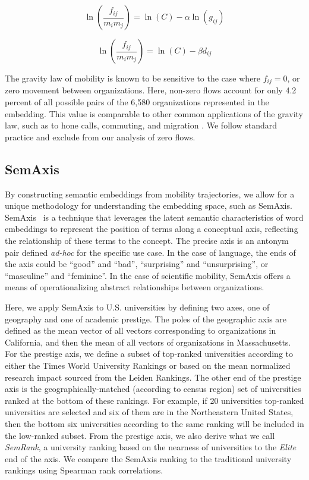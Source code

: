 \documentclass[12pt]{article} %
\begin{document}
\begin{equation}
    \label{eq:linear_flux_geo}
    \ln(\frac{f_{ij}}{m_im_j}) = \ln(C)  - \alpha \ln(g_{ij})
\end{equation}

\begin{equation}
    \label{eq:linear_flux_emb}
    \ln(\frac{f_{ij}}{m_im_j}) = \ln(C) - \beta d_{ij}
\end{equation}

The gravity law of mobility is known to be sensitive to the case where $f_{ij} = 0$, or zero movement between organizations. 
Here, non-zero flows account for only 4.2 percent of all possible pairs of the 6,580 organizations represented in the embedding.
This value is comparable to other common applications of the gravity law, such as to hone calls, commuting, and migration \cite{simini2012universal}.
We follow standard practice and exclude from our analysis of zero flows. 


%
%
\subsection*{SemAxis}
By constructing semantic embeddings from mobility trajectories, we allow for a unique methodology for understanding the embedding space, such as SemAxis.
SemAxis~\cite{an2018semaxis} is a technique that leverages the latent semantic characteristics of word embeddings to represent the position of terms along a conceptual axis, reflecting the relationship of these terms to the concept. 
The precise axis is an antonym pair defined \textit{ad-hoc} for the specific use case.
In the case of language, the ends of the axis could be ``good'' and ``bad'', ``surprising'' and ``unsurprising'', or ``masculine'' and ``feminine''. 
In the case of scientific mobility, SemAxis offers a means of operationalizing abstract relationships between organizations.

Here, we apply SemAxis to U.S. universities by defining two axes, one of geography and one of academic prestige. 
The poles of the geographic axis are defined as the mean vector of all vectors corresponding to organizations in California, and then the mean of all vectors of organizations in Massachusetts. 
For the prestige axis, we define a subset of top-ranked universities according to either the Times World University Rankings or based on the mean normalized research impact sourced from the Leiden Rankings. 
The other end of the prestige axis is the geographically-matched (according to census region) set of universities ranked at the bottom of these rankings.
For example, if 20 universities top-ranked universities are selected and six of them are in the Northeastern United States, then the bottom six universities according to the same ranking will be included in the low-ranked subset. 
From the prestige axis, we also derive what we call \textit{SemRank}, a university ranking based on the nearness of universities to the \textit{Elite} end of the axis. 
We compare the SemAxis ranking to the traditional university rankings using Spearman rank correlations. 
\end{document}
